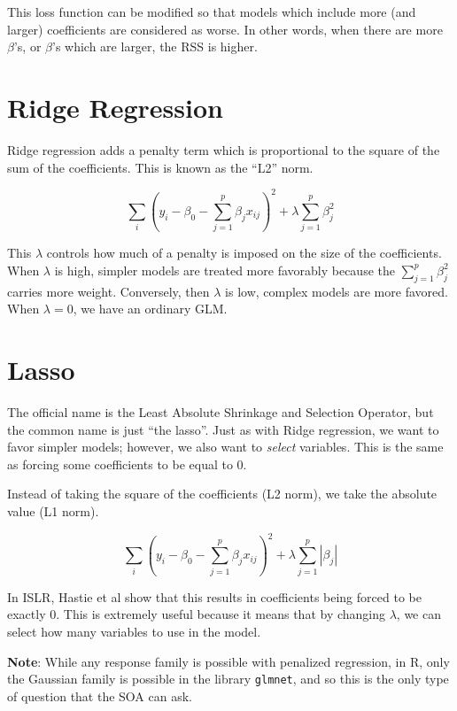 \documentclass[
  openany]{book}
\begin{document}
This loss function can be modified so that models which include more (and larger) coefficients are considered as worse. In other words, when there are more \(\beta\)'s, or \(\beta\)'s which are larger, the RSS is higher.

\hypertarget{ridge-regression}{%
\section{Ridge Regression}\label{ridge-regression}}

Ridge regression adds a penalty term which is proportional to the square of the sum of the coefficients. This is known as the ``L2'' norm.

\[
\sum_i(y_i - \beta_0 - \sum_{j = 1}^p\beta_j x_{ij})^2 + \lambda \sum_{j = 1}^p\beta_j^2
\]

This \(\lambda\) controls how much of a penalty is imposed on the size of the coefficients. When \(\lambda\) is high, simpler models are treated more favorably because the \(\sum_{j = 1}^p\beta_j^2\) carries more weight. Conversely, then \(\lambda\) is low, complex models are more favored. When \(\lambda = 0\), we have an ordinary GLM.

\hypertarget{lasso}{%
\section{Lasso}\label{lasso}}

The official name is the Least Absolute Shrinkage and Selection Operator, but the common name is just ``the lasso''. Just as with Ridge regression, we want to favor simpler models; however, we also want to \emph{select} variables. This is the same as forcing some coefficients to be equal to 0.

Instead of taking the square of the coefficients (L2 norm), we take the absolute value (L1 norm).

\[
\sum_i(y_i - \beta_0 - \sum_{j = 1}^p\beta_j x_{ij})^2 + \lambda \sum_{j = 1}^p|\beta_j|
\]

In ISLR, Hastie et al show that this results in coefficients being forced to be exactly 0. This is extremely useful because it means that by changing \(\lambda\), we can select how many variables to use in the model.

\textbf{Note}: While any response family is possible with penalized regression, in R, only the Gaussian family is possible in the library \texttt{glmnet}, and so this is the only type of question that the SOA can ask.
\end{document}
